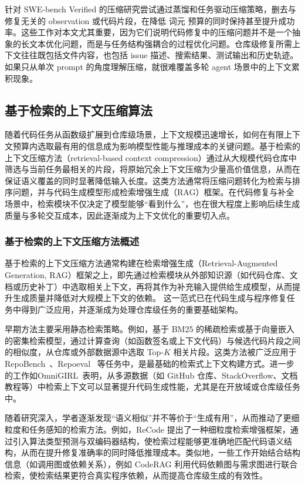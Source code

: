 针对 SWE-bench Verified 的压缩研究尝试通过蒸馏和任务驱动压缩策略，删去与修复无关的 observation 或代码片段，在降低 词元 预算的同时保持甚至提升成功率。这些工作对本文尤其重要，因为它们说明代码修复中的压缩问题并不是一个抽象的长文本优化问题，而是与任务结构强耦合的过程优化问题。仓库级修复所需上下文往往既包括文件内容，也包括 issue 描述、搜索结果、测试输出和历史轨迹。如果只从单次 prompt 的角度理解压缩，就很难覆盖多轮 agent 场景中的上下文累积现象。

\subsection{基于检索的上下文压缩算法}

随着代码任务从函数级扩展到仓库级场景，上下文规模迅速增长，如何在有限上下文预算内选取最有用的信息成为影响模型性能与推理成本的关键问题。基于检索的上下文压缩方法（retrieval-based context compression）通过从大规模代码仓库中筛选与当前任务最相关的片段，将原始冗余上下文压缩为少量高价值信息，从而在保证语义覆盖的同时显著降低输入长度。这类方法通常将压缩问题转化为检索与排序问题，并与代码生成模型形成检索增强生成（RAG）框架。在代码修复与补全场景中，检索模块不仅决定了模型能够“看到什么”，也在很大程度上影响后续生成质量与多轮交互成本，因此逐渐成为上下文优化的重要切入点。

\subsubsection{基于检索的上下文压缩方法概述}

基于检索的上下文压缩方法通常构建在检索增强生成（Retrieval-Augmented Generation, RAG）框架之上，即先通过检索模块从外部知识源（如代码仓库、文档或历史补丁）中选取相关上下文，再将其作为补充输入提供给生成模型，从而提升生成质量并降低对大规模上下文的依赖。 这一范式已在代码生成与程序修复任务中得到广泛应用，并逐渐成为处理仓库级任务的重要基础架构。

早期方法主要采用静态检索策略。例如，基于 BM25 的稀疏检索或基于向量嵌入的密集检索模型，通过计算查询（如函数签名或上下文代码）与候选代码片段之间的相似度，从仓库或外部数据源中选取 Top-$K$ 相关片段。这类方法被广泛应用于 RepoBench~\cite{liu2023repobench}、Repoeval~\cite{zhang2023repocoder} 等任务中，是最基础的检索式上下文构建方式。进一步的工作如OmniGIRL~\cite{guo2025omnigirl}表明，从多源数据（如 GitHub 仓库、StackOverflow、文档教程等）中检索上下文可以显著提升代码生成性能，尤其是在开放域或仓库级任务中。

随着研究深入，学者逐渐发现“语义相似”并不等价于“生成有用”，从而推动了更细粒度和任务感知的检索方法。例如，ReCode 提出了一种细粒度检索增强框架，通过引入算法类型预测与双编码器结构，使检索过程能够更准确地匹配代码语义结构，从而在提升修复准确率的同时降低推理成本。类似地，一些工作开始结合结构信息（如调用图或依赖关系），例如 CodeRAG 利用代码依赖图与需求图进行联合检索，使检索结果更符合真实程序依赖，从而提高仓库级生成的有效性。

